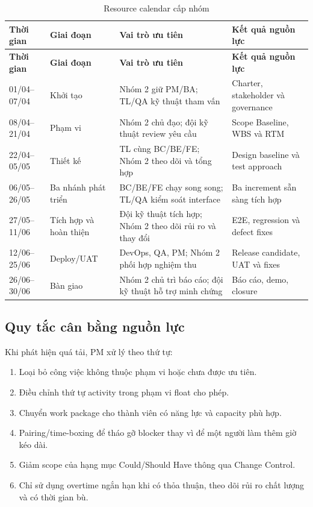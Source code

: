 \begin{longtable}{| p{2.1cm} | p{2.2cm} | p{4.4cm} | p{4.1cm} |}
\caption{Resource calendar cấp nhóm}\label{tab:resource-calendar}\\
\hline
\textbf{Thời gian} & \textbf{Giai đoạn} & \textbf{Vai trò ưu tiên} & \textbf{Kết quả nguồn lực} \\
\hline
\endfirsthead
\hline
\textbf{Thời gian} & \textbf{Giai đoạn} & \textbf{Vai trò ưu tiên} & \textbf{Kết quả nguồn lực} \\
\hline
\endhead
01/04--07/04 & Khởi tạo & Nhóm 2 giữ PM/BA; TL/QA kỹ thuật tham vấn & Charter, stakeholder và governance \\ \hline
08/04--21/04 & Phạm vi & Nhóm 2 chủ đạo; đội kỹ thuật review yêu cầu & Scope Baseline, WBS và RTM \\ \hline
22/04--05/05 & Thiết kế & TL cùng BC/BE/FE; Nhóm 2 theo dõi và tổng hợp & Design baseline và test approach \\ \hline
06/05--26/05 & Ba nhánh phát triển & BC/BE/FE chạy song song; TL/QA kiểm soát interface & Ba increment sẵn sàng tích hợp \\ \hline
27/05--11/06 & Tích hợp và hoàn thiện & Đội kỹ thuật tích hợp; Nhóm 2 theo dõi rủi ro và thay đổi & E2E, regression và defect fixes \\ \hline
12/06--25/06 & Deploy/UAT & DevOps, QA, PM; Nhóm 2 phối hợp nghiệm thu & Release candidate, UAT và fixes \\ \hline
26/06--30/06 & Bàn giao & Nhóm 2 chủ trì báo cáo; đội kỹ thuật hỗ trợ minh chứng & Báo cáo, demo, closure \\
\hline
\end{longtable}


\subsection{Quy tắc cân bằng nguồn lực}

Khi phát hiện quá tải, PM xử lý theo thứ tự:

\begin{enumerate}
  \item Loại bỏ công việc không thuộc phạm vi hoặc chưa được ưu tiên.
  \item Điều chỉnh thứ tự activity trong phạm vi float cho phép.
  \item Chuyển work package cho thành viên có năng lực và capacity phù hợp.
  \item Pairing/time-boxing để tháo gỡ blocker thay vì để một người làm thêm giờ kéo dài.
  \item Giảm scope của hạng mục Could/Should Have thông qua Change Control.
  \item Chỉ sử dụng overtime ngắn hạn khi có thỏa thuận, theo dõi rủi ro chất lượng và có thời gian bù.
\end{enumerate}

